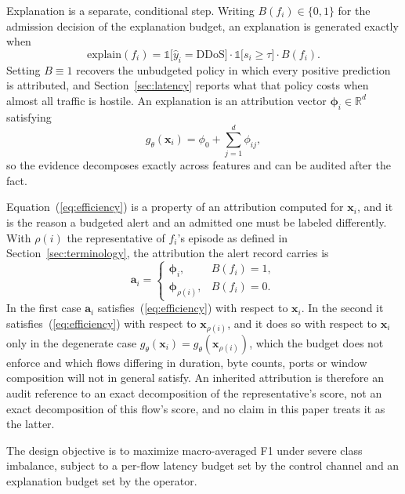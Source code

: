 \documentclass{ieeeaccess}
\begin{document}
Explanation is a separate, conditional step. Writing $B(f_i) \in \{0,1\}$ for the
admission decision of the explanation budget, an explanation is generated exactly
when
\begin{equation}
\mathrm{explain}(f_i) = \mathbb{1}\bigl[\hat{y}_i = \mathrm{DDoS}\bigr] \cdot
                        \mathbb{1}\bigl[s_i \geq \tau\bigr] \cdot B(f_i).
\label{eq:trigger}
\end{equation}
Setting $B \equiv 1$ recovers the unbudgeted policy in which every positive
prediction is attributed, and Section~\ref{sec:latency} reports what that
policy costs when almost all traffic is hostile. An explanation is an attribution vector
$\boldsymbol{\phi}_i \in \mathbb{R}^{d}$ satisfying
\begin{equation}
g_{\theta}(\mathbf{x}_i) = \phi_0 + \sum_{j=1}^{d} \phi_{ij},
\label{eq:efficiency}
\end{equation}
so the evidence decomposes exactly across features and can be audited after the
fact.

Equation~(\ref{eq:efficiency}) is a property of an attribution computed for
$\mathbf{x}_i$, and it is the reason a budgeted alert and an admitted one must be
labeled differently. With $\rho(i)$ the representative of $f_i$'s episode as
defined in Section~\ref{sec:terminology}, the attribution the alert record
carries is
\begin{equation}
\mathbf{a}_i =
\begin{cases}
\boldsymbol{\phi}_i, & B(f_i) = 1,\\[2pt]
\boldsymbol{\phi}_{\rho(i)}, & B(f_i) = 0 .
\end{cases}
\label{eq:deliver}
\end{equation}
In the first case $\mathbf{a}_i$ satisfies~(\ref{eq:efficiency}) with respect to
$\mathbf{x}_i$. In the second it satisfies~(\ref{eq:efficiency}) with respect to
$\mathbf{x}_{\rho(i)}$, and it does so with respect to $\mathbf{x}_i$ only in the
degenerate case $g_{\theta}(\mathbf{x}_i) = g_{\theta}(\mathbf{x}_{\rho(i)})$,
which the budget does not enforce and which flows differing in duration, byte
counts, ports or window composition will not in general satisfy. An inherited
attribution is therefore an audit reference to an exact decomposition of the
representative's score, not an exact decomposition of this flow's score, and no
claim in this paper treats it as the latter.

The design objective is to maximize macro-averaged F1 under severe class
imbalance, subject to a per-flow latency budget set by the control channel and an
explanation budget set by the operator.
\end{document}

